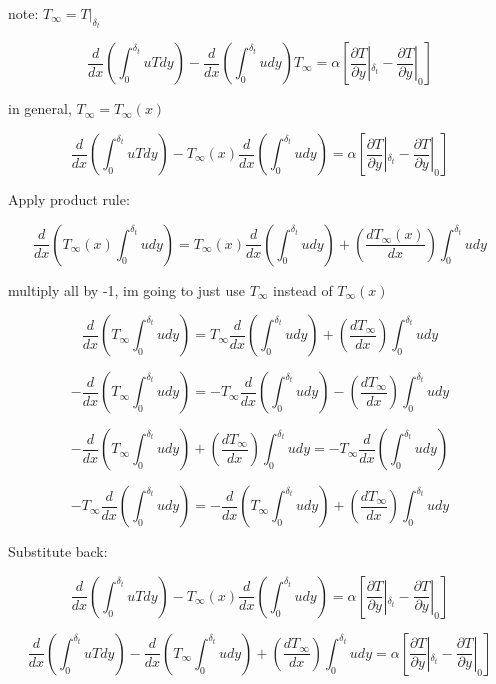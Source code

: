 \documentclass[11pt]{article}
\begin{document}
note: $T_\infty = T|_{\delta_t}$

$$ \frac{d}{dx} \left( \int_{0}^{\delta_t} uT dy \right)   -\frac{d}{dx} \left( \int_{0}^{\delta_t} u dy \right)T_\infty   = \alpha [\frac{\partial T}{\partial y}|_{\delta_t} -  \frac{\partial T}{\partial y} |_0] $$ 

in general, $T_\infty = T_\infty (x)$

$$ \frac{d}{dx} \left( \int_{0}^{\delta_t} uT dy \right)   - T_\infty (x) \frac{d}{dx} \left( \int_{0}^{\delta_t} u dy \right)    = \alpha [\frac{\partial T}{\partial y}|_{\delta_t} -  \frac{\partial T}{\partial y} |_0] $$ 

Apply product rule:

$$\frac{d}{dx} \left( T_\infty (x) \int_{0}^{\delta_t} u dy \right) = T_\infty (x) \frac{d}{dx} \left( \int_{0}^{\delta_t} u dy \right) + \left( \frac{d T_\infty (x)}{dx} \right) \int_{0}^{\delta_t} u dy  $$

multiply all by -1, im going to just use $T_\infty$ instead of $T_\infty (x)$

$$\frac{d}{dx} \left( T_\infty  \int_{0}^{\delta_t} u dy \right) = T_\infty  \frac{d}{dx} \left( \int_{0}^{\delta_t} u dy \right) + \left( \frac{d T_\infty }{dx} \right) \int_{0}^{\delta_t} u dy  $$

$$-\frac{d}{dx} \left( T_\infty  \int_{0}^{\delta_t} u dy \right) = - T_\infty  \frac{d}{dx} \left( \int_{0}^{\delta_t} u dy \right) - \left( \frac{d T_\infty }{dx} \right) \int_{0}^{\delta_t} u dy  $$

$$-\frac{d}{dx} \left( T_\infty  \int_{0}^{\delta_t} u dy \right) + \left( \frac{d T_\infty }{dx} \right) \int_{0}^{\delta_t} u dy = - T_\infty  \frac{d}{dx} \left( \int_{0}^{\delta_t} u dy \right)   $$

$$ - T_\infty  \frac{d}{dx} \left( \int_{0}^{\delta_t} u dy \right) = -\frac{d}{dx} \left( T_\infty  \int_{0}^{\delta_t} u dy \right) + \left( \frac{d T_\infty }{dx} \right) \int_{0}^{\delta_t} u dy   $$

Substitute back:

$$ \frac{d}{dx} \left( \int_{0}^{\delta_t} uT dy \right)   - T_\infty (x) \frac{d}{dx} \left( \int_{0}^{\delta_t} u dy \right)    = \alpha [\frac{\partial T}{\partial y}|_{\delta_t} -  \frac{\partial T}{\partial y} |_0] $$ 


$$ \frac{d}{dx} \left( \int_{0}^{\delta_t} uT dy \right)   -\frac{d}{dx} \left( T_\infty  \int_{0}^{\delta_t} u dy \right) + \left( \frac{d T_\infty }{dx} \right) \int_{0}^{\delta_t} u dy     = \alpha [\frac{\partial T}{\partial y}|_{\delta_t} -  \frac{\partial T}{\partial y} |_0] $$ 
\end{document}
